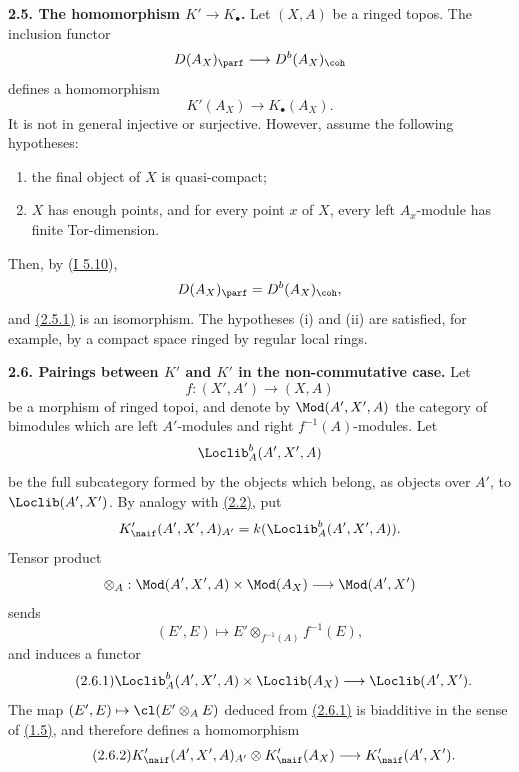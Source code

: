 \textbf{2.5. The homomorphism \(K'\to K_{\bullet}\).} Let \((X,A)\) be a ringed topos. The inclusion functor
\[
 D(A_X)_{\parf}\longrightarrow D^b(A_X)_{\coh}
\]
defines a homomorphism
\begin{equation}\tag{2.5.1}
 K'(A_X)\longrightarrow K_{\bullet}(A_X).
\end{equation}
It is not in general injective or surjective. However, assume the following hypotheses:
\begin{enumerate}[label=(\roman*)]
\item the final object of \(X\) is quasi-compact;
\item \(X\) has enough points, and for every point \(x\) of \(X\), every left \(A_x\)-module has finite Tor-dimension.
\end{enumerate}
Then, by (\hyperlink{sga6.e01.cor.5-10}{I 5.10}),
\[
 D(A_X)_{\parf}=D^b(A_X)_{\coh},
\]
and \hyperlink{sga6.e04.eq.2-5-1}{(2.5.1)} is an isomorphism. The hypotheses (i) and (ii) are satisfied, for example, by a compact space ringed by regular local rings.

\textbf{2.6. Pairings between \(K'\) and \(K'\) in the non-commutative case.} Let
\[
 f:(X',A')\longrightarrow (X,A)
\]
be a morphism of ringed topoi, and denote by \(\Mod(A',X',A)\) the category of bimodules which are left \(A'\)-modules and right \(f^{-1}(A)\)-modules. Let
\[
 \Loclib_A^b(A',X',A)
\]
be the full subcategory formed by the objects which belong, as objects over \(A'\), to \(\Loclib(A',X')\). By analogy with \hyperlink{sga6.e04.def.2-2}{(2.2)}, put
\[
 K'_{\naif}(A',X',A)_{A'}=k(\Loclib_A^b(A',X',A)).
\]
Tensor product
\[
 \otimes_A:\Mod(A',X',A)\times\Mod(A_X)\longrightarrow \Mod(A',X')
\]
sends
\[
 (E',E)\longmapsto E'\otimes_{f^{-1}(A)}f^{-1}(E),
\]
and induces a functor
\begin{equation}\tag{2.6.1}
 \Loclib_A^b(A',X',A)\times\Loclib(A_X)\longrightarrow\Loclib(A',X').
\end{equation}
The map \((E',E)\mapsto\cl(E'\otimes_A E)\) deduced from \hyperlink{sga6.e04.eq.2-6-1}{(2.6.1)} is biadditive in the sense of \hyperlink{sga6.e04.para.1-5}{(1.5)}, and therefore defines a homomorphism
\begin{equation}\tag{2.6.2}
 K'_{\naif}(A',X',A)_{A'}\otimes K'_{\naif}(A_X)\longrightarrow K'_{\naif}(A',X').
\end{equation}

